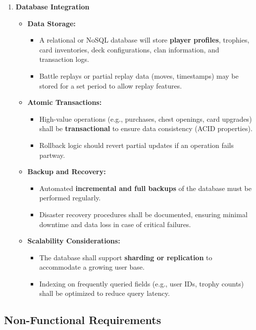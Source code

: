 \documentclass{article}
\begin{document}
\begin{enumerate}[label=\textbf{FR\arabic*.}]
\item \textbf{Database Integration}
\begin{itemize}
    \item \textbf{Data Storage:}
    \begin{itemize}
        \item A relational or NoSQL database will store \textbf{player profiles}, trophies, card inventories, deck configurations, clan information, and transaction logs.
        \item Battle replays or partial replay data (moves, timestamps) may be stored for a set period to allow replay features.
    \end{itemize}
    \item \textbf{Atomic Transactions:}
    \begin{itemize}
        \item High-value operations (e.g., purchases, chest openings, card upgrades) shall be \textbf{transactional} to ensure data consistency (ACID properties).
        \item Rollback logic should revert partial updates if an operation fails partway.
    \end{itemize}
    \item \textbf{Backup and Recovery:}
    \begin{itemize}
        \item Automated \textbf{incremental and full backups} of the database must be performed regularly.
        \item Disaster recovery procedures shall be documented, ensuring minimal downtime and data loss in case of critical failures.
    \end{itemize}
    \item \textbf{Scalability Considerations:}
    \begin{itemize}
        \item The database shall support \textbf{sharding or replication} to accommodate a growing user base.
        \item Indexing on frequently queried fields (e.g., user IDs, trophy counts) shall be optimized to reduce query latency.
    \end{itemize}
\end{itemize}

\end{enumerate}

\newpage

\subsection{Non-Functional Requirements}
\end{document}
